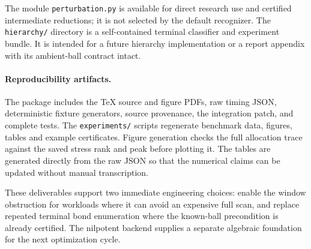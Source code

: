 The module \texttt{perturbation.py} is available for direct research use
and certified intermediate reductions; it is not selected by the default
recognizer.  The \texttt{hierarchy/} directory is a self-contained terminal
classifier and experiment bundle.  It is intended for a future hierarchy
implementation or a report appendix with its ambient-ball contract intact.

\paragraph{Reproducibility artifacts.}
The package includes the TeX source and figure PDFs, raw timing JSON,
deterministic fixture generators, source provenance, the integration patch,
and complete tests.  The \texttt{experiments/} scripts regenerate benchmark
data, figures, tables and example certificates.  Figure generation checks
the full allocation trace against the saved stress rank and peak before
plotting it.  The tables are generated directly from the raw JSON so that
the numerical claims can be updated without manual transcription.

These deliverables support two immediate engineering choices: enable the
window obstruction for workloads where it can avoid an expensive full
scan, and replace repeated terminal bond enumeration where the known-ball
precondition is already certified.  The nilpotent backend supplies a
separate algebraic foundation for the next optimization cycle.
